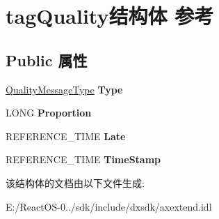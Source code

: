 \hypertarget{structtag_quality}{}\section{tag\+Quality结构体 参考}
\label{structtag_quality}
\subsection*{Public 属性}
\begin{DoxyCompactItemize}
\item 
\mbox{\label{structtag_quality_a4358f2e795f04a5ed3b72d83dc569a3e}} 
\hyperlink{interfaceenum}{Quality\+Message\+Type} {\bfseries Type}
\item 
\mbox{\label{structtag_quality_ab5273743cc7878c6d2a84beff0cb1324}} 
L\+O\+NG {\bfseries Proportion}
\item 
\mbox{\label{structtag_quality_a71ca32e45d790ee8f82e9e0492b1257a}} 
R\+E\+F\+E\+R\+E\+N\+C\+E\+\_\+\+T\+I\+ME {\bfseries Late}
\item 
\mbox{\label{structtag_quality_aff30bf381c117a111876b9c8a0a2a3a2}} 
R\+E\+F\+E\+R\+E\+N\+C\+E\+\_\+\+T\+I\+ME {\bfseries Time\+Stamp}
\end{DoxyCompactItemize}


该结构体的文档由以下文件生成\+:\begin{DoxyCompactItemize}
\item 
E\+:/\+React\+O\+S-\/0../sdk/include/dxsdk/axextend.\+idl\end{DoxyCompactItemize}
